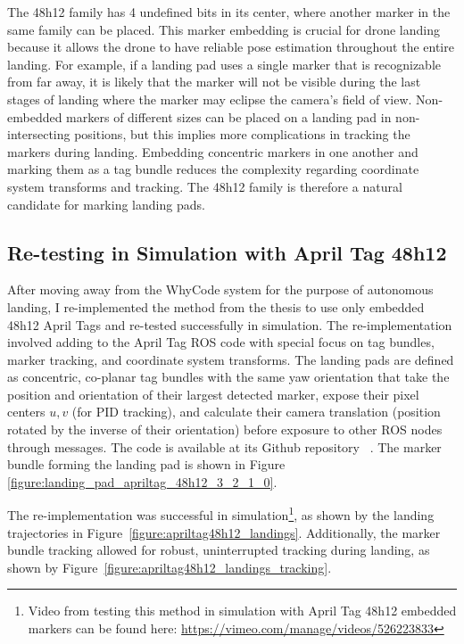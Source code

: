 The 48h12 family has 4 undefined bits in its center, where another marker in the same family can be placed.
This marker embedding is crucial for drone landing because it allows the drone to have
reliable pose estimation throughout the entire landing.
For example, if a landing pad uses a single marker that is recognizable from far away,
it is likely that the marker will not be visible during the last stages of landing
where the marker may eclipse the camera's field of view.
Non-embedded markers of different sizes can be placed on a landing pad in non-intersecting positions,
but this implies more complications in tracking the markers during landing.
Embedding concentric markers in one another and marking them as a tag bundle reduces the complexity
regarding coordinate system transforms and tracking.
The 48h12 family is therefore a natural candidate for marking landing pads.

\subsection{Re-testing in Simulation with April Tag 48h12}

After moving away from the WhyCode system for the purpose of autonomous landing, I re-implemented the method
from the thesis to use only embedded 48h12 April Tags and re-tested successfully in simulation.
The re-implementation involved adding to the April Tag ROS code with special focus on
tag bundles,
marker tracking,
and coordinate system transforms.
The landing pads are defined as concentric, co-planar tag bundles with the same yaw orientation
that take the position and orientation of their largest detected marker,
expose their pixel centers $u,v$ (for PID tracking),
and calculate their camera translation (position rotated by the inverse of their orientation)
before exposure to other ROS nodes through messages.
The code is available at its Github repository ~\cite{edited_apriltag}.
The marker bundle forming the landing pad is shown in Figure \ref{figure:landing_pad_apriltag_48h12_3_2_1_0}.

The re-implementation was successful in simulation\footnote{Video from testing this method in simulation with April Tag 48h12 embedded markers can be found here: \url{https://vimeo.com/manage/videos/526223833}}, as shown by the landing trajectories in Figure~\ref{figure:apriltag48h12_landings}.
Additionally, the marker bundle tracking allowed for robust, uninterrupted tracking during landing, as shown by Figure~\ref{figure:apriltag48h12_landings_tracking}.

